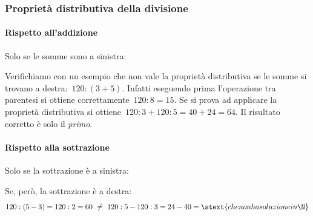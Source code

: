 
\vspace{.5em}

\subsubsection{Proprietà distributiva della divisione}

\paragraph{Rispetto all'addizione}
Solo se le somme sono a sinistra:

\vspace{.5em}

Verifichiamo con un esempio che non vale la proprietà distributiva se le 
somme si trovano a destra:~\(120 : (3 + 5)\).
Infatti eseguendo prima l'operazione tra parentesi si ottiene 
correttamente~\(120 : 8 = 15\). Se si prova ad applicare
la proprietà distributiva si ottiene~\(120 : 3 + 120 : 5 = 40 + 24 = 64\). 
Il risultato corretto è solo il \emph{primo}.

\paragraph{Rispetto alla sottrazione}
Solo se la sottrazione è a sinistra:

\vspace{.5em}

\vspace{.5em}
Se, però, la sottrazione è a destra:
\[120 : (5 - 3) = 120 : 2 = 60 ~\neq~ 
120 : 5 - 120 : 3 = 24 - 40 = \stext{che non ha soluzione in \N}\]


